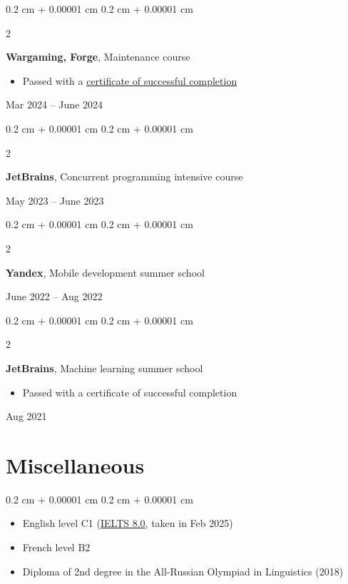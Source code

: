 \documentclass[10pt, letterpaper]{article}
\newenvironment{highlights}{
    \begin{itemize}[
        topsep=0.10 cm,
        parsep=0.10 cm,
        partopsep=0pt,
        itemsep=0pt,
        leftmargin=0.4 cm + 10pt
    ]
}{
    \end{itemize}
} %
\newenvironment{highlightsforbulletentries}{
    \begin{itemize}[
        topsep=0.10 cm,
        parsep=0.10 cm,
        partopsep=0pt,
        itemsep=0pt,
        leftmargin=10pt
    ]
}{
    \end{itemize}
} %
\newenvironment{onecolentry}{
    \begin{adjustwidth}{
        0.2 cm + 0.00001 cm
    }{
        0.2 cm + 0.00001 cm
    }
}{
    \end{adjustwidth}
} %
\newenvironment{twocolentry}[2][]{
    \onecolentry
    \def\secondColumn{#2}
    \setcolumnwidth{\fill, 4.5 cm}
    \begin{paracol}{2}
}{
    \switchcolumn \raggedleft \secondColumn
    \end{paracol}
    \endonecolentry
} %
\begin{document}
        \vspace{0.2 cm}

        \begin{twocolentry}{
            Mar 2024 – June 2024
        }
            \textbf{Wargaming, Forge}, Maintenance course
            \begin{highlights}
                \item Passed with a \href{https://drive.google.com/file/d/1p-x37Ugsu4JONwdZj5UdreDqEqGhXrW3/view?usp=sharing}{certificate of successful completion}
            \end{highlights}
        \end{twocolentry}


        \vspace{0.2 cm}

        \begin{twocolentry}{
            May 2023 – June 2023
        }
            \textbf{JetBrains}, Concurrent programming intensive course
        \end{twocolentry}


        \vspace{0.2 cm}

        \begin{twocolentry}{
            June 2022 – Aug 2022
        }
            \textbf{Yandex}, Mobile development summer school
        \end{twocolentry}


        \vspace{0.2 cm}

        \begin{twocolentry}{
            Aug 2021
        }
            \textbf{JetBrains}, Machine learning summer school
            \begin{highlights}
                \item Passed with a certificate of successful completion
            \end{highlights}
        \end{twocolentry}



    
    \section{Miscellaneous}

    \begin{onecolentry}
        \begin{highlightsforbulletentries}


        \item English level C1 (\href{https://drive.google.com/file/d/1d7x1HtVZTvp45cFnm_21eMtTf5pq8atW/view?usp=sharing}{IELTS 8.0}, taken in Feb 2025)

        \item French level B2

        \item Diploma of 2nd degree in the All-Russian Olympiad in Linguistics (2018)


        \end{highlightsforbulletentries}
    \end{onecolentry}
\end{document}
